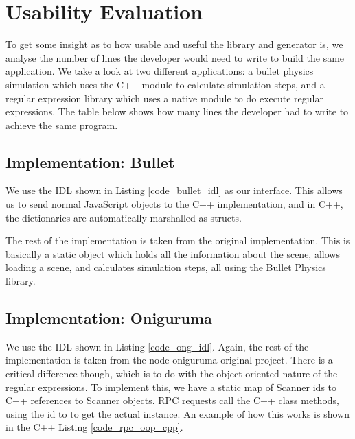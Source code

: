 \section{Usability Evaluation} %
\label{sec:usability_evaluation}
To get some insight as to how usable and useful the library and generator is, we analyse the number of lines the developer would need to write to build the same application. We take a look at two different applications: a bullet physics simulation which uses the C++ module to calculate simulation steps, and a regular expression library which uses a native module to do execute regular expressions. The table below shows how many lines the developer had to write to achieve the same program.

\subsection{Implementation: Bullet} %
\label{sub:implementation_bullet_evaluation}
We use the IDL shown in Listing \ref{code_bullet_idl} as our interface. This allows us to send normal JavaScript objects to the C++ implementation, and in C++, the dictionaries are automatically marshalled as structs.

The rest of the implementation is taken from the original implementation. This is basically a static object which holds all the information about the scene, allows loading a scene, and calculates simulation steps, all using the Bullet Physics library.

\subsection{Implementation: Oniguruma} %
\label{sub:implementation_oniguruma_evaluation}
We use the IDL shown in Listing \ref{code_ong_idl}. Again, the rest of the implementation is taken from the node-oniguruma original project. There is a critical difference though, which is to do with the object-oriented nature of the regular expressions. To implement this, we have a static map of Scanner ids to C++ references to Scanner objects. RPC requests call the C++ class methods, using the id to to get the actual instance. An example of how this works is shown in the C++ Listing \ref{code_rpc_oop_cpp}. 

